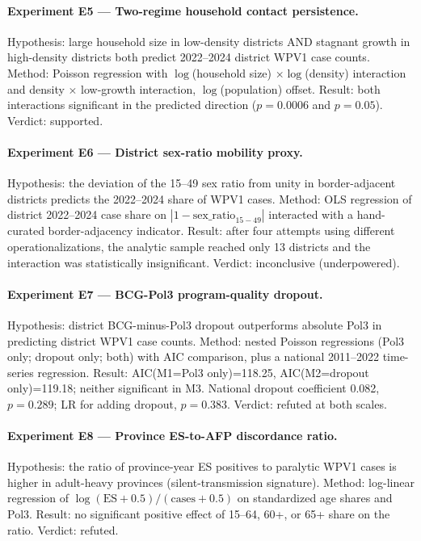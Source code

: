 \documentclass[11pt]{article}
\begin{document}
\paragraph{Experiment E5 --- Two-regime household contact persistence.} Hypothesis: large household size in low-density districts AND stagnant growth in high-density districts both predict 2022--2024 district WPV1 case counts. Method: Poisson regression with $\log$(household size) $\times \log$(density) interaction and density $\times$ low-growth interaction, $\log$(population) offset. Result: both interactions significant in the predicted direction ($p{=}0.0006$ and $p{=}0.05$). Verdict: supported.

\paragraph{Experiment E6 --- District sex-ratio mobility proxy.} Hypothesis: the deviation of the 15--49 sex ratio from unity in border-adjacent districts predicts the 2022--2024 share of WPV1 cases. Method: OLS regression of district 2022--2024 case share on $|1 - \text{sex\_ratio}_{15-49}|$ interacted with a hand-curated border-adjacency indicator. Result: after four attempts using different operationalizations, the analytic sample reached only 13 districts and the interaction was statistically insignificant. Verdict: inconclusive (underpowered).

\paragraph{Experiment E7 --- BCG-Pol3 program-quality dropout.} Hypothesis: district BCG-minus-Pol3 dropout outperforms absolute Pol3 in predicting district WPV1 case counts. Method: nested Poisson regressions (Pol3 only; dropout only; both) with AIC comparison, plus a national 2011--2022 time-series regression. Result: AIC(M1=Pol3 only)=118.25, AIC(M2=dropout only)=119.18; neither significant in M3. National dropout coefficient 0.082, $p{=}0.289$; LR for adding dropout, $p{=}0.383$. Verdict: refuted at both scales.

\paragraph{Experiment E8 --- Province ES-to-AFP discordance ratio.} Hypothesis: the ratio of province-year ES positives to paralytic WPV1 cases is higher in adult-heavy provinces (silent-transmission signature). Method: log-linear regression of $\log(\text{ES}+0.5)/(\text{cases}+0.5)$ on standardized age shares and Pol3. Result: no significant positive effect of 15--64, 60+, or 65+ share on the ratio. Verdict: refuted.
\end{document}
